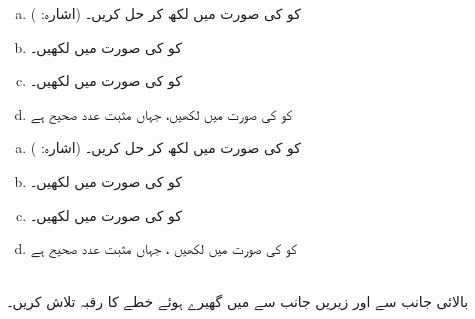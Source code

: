 \begin{enumerate}[a.]
\item
{} کو  کی صورت میں لکھ کر حل کریں۔ (اشارہ: )
\item
{} کو  کی صورت میں لکھیں۔
\item
{} کو  کی صورت میں لکھیں۔
\item
{} کو  کی صورت میں لکھیں،  جہاں  مثبت عدد صحیح ہے
\end{enumerate}
\begin{enumerate}[a.]
\item
{} کو  کی صورت میں لکھ کر حل کریں۔ (اشارہ: )
\item
{} کو  کی صورت میں لکھیں۔
\item
{} کو  کی صورت میں لکھیں۔
\item
{} کو  کی صورت میں لکھیں ، جہاں  مثبت عدد صحیح ہے
\end{enumerate}
\\
بالائی جانب سے   اور زیریں جانب  سے  میں گھیرے ہوئے خطے کا رقبہ تلاش کریں۔
